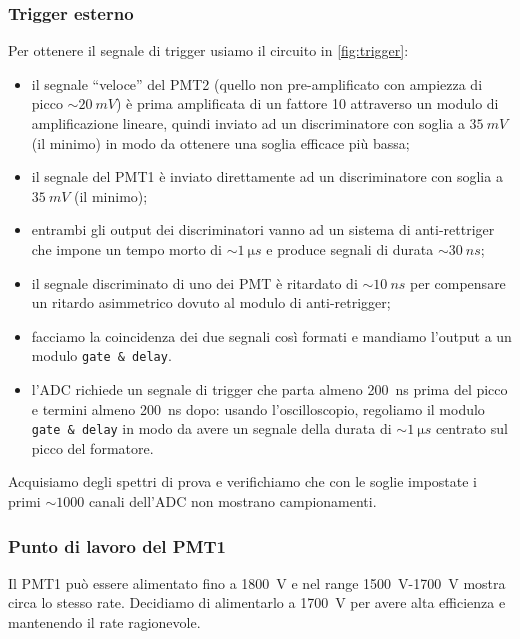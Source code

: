 \subsubsection{Trigger esterno}
Per ottenere il segnale di trigger usiamo il circuito in \autoref{fig:trigger}:
\begin{itemize}
	\item il segnale ``veloce'' del PMT2 (quello non pre-amplificato con ampiezza di picco $\sim\SI{20}{mV}$) è prima amplificata di un fattore 10 attraverso un modulo di amplificazione lineare, quindi inviato ad un discriminatore con soglia a $\SI{35}{mV}$ (il minimo) in modo da ottenere una soglia efficace più bassa;
	\item il segnale del PMT1 è inviato direttamente ad un discriminatore con soglia a $\SI{35}{mV}$ (il minimo);
	\item entrambi gli output dei discriminatori vanno ad un sistema di anti-rettriger che impone un tempo morto di $\sim\SI{1}{\micro s}$ e produce segnali di durata $\sim\SI{30}{ns}$;
	\item il segnale discriminato di uno dei PMT è ritardato di $\sim\SI{10}{ns}$ per compensare un ritardo asimmetrico dovuto al modulo di anti-retrigger;
	\item facciamo la coincidenza dei due segnali così formati e mandiamo l'output a un modulo \texttt{gate \& delay}.
	\item l'ADC richiede un segnale di trigger che parta almeno \SI{200}{ns} prima del picco e termini almeno \SI{200}{ns} dopo: usando l'oscilloscopio, regoliamo il modulo \texttt{gate \& delay} in modo da avere un segnale della durata di $\sim\SI{1}{\micro s}$ centrato sul picco del formatore.
\end{itemize}
Acquisiamo degli spettri di prova e verifichiamo che con le soglie impostate i primi $\sim1000$ canali dell'ADC non mostrano campionamenti.

\subsubsection{Punto di lavoro del PMT1}
Il PMT1 può essere alimentato fino a \SI{1800}{V} e nel range \SI{1500}{V}-\SI{1700}{V} mostra circa lo stesso rate. Decidiamo di alimentarlo a \SI{1700}{V} per avere alta efficienza e mantenendo il rate ragionevole.
